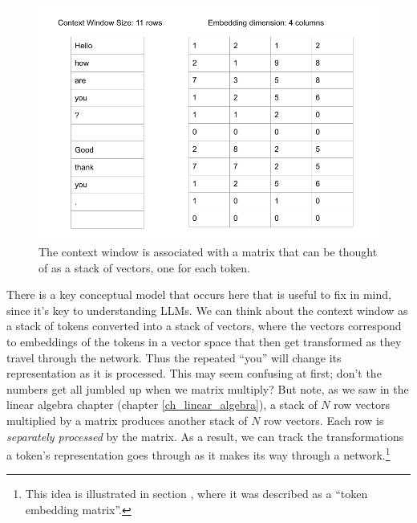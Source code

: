 \begin{figure}[h]
\centering
\includegraphics[scale=.45]{./images/contextWindowAsStack.png}
\caption[Jeff Yoshimi]{The context window is associated with a matrix that can be thought of as a stack of vectors, one for each token. }
\label{nextWordPrediction}
\end{figure}

There is a key conceptual model that occurs here that is useful to fix in mind, since it's key to understanding LLMs. We can think about the context window as a stack of tokens converted into a stack of vectors, where the vectors correspond to embeddings of the tokens in a vector space that then get transformed as they travel through the network. Thus the repeated ``you'' will change its representation as it is processed. This may seem confusing at first; don't the numbers get all jumbled up when we matrix multiply? But note, as we saw in the linear algebra chapter (chapter \ref{ch_linear_algebra}), a stack of $N$ row vectors multiplied by a matrix produces another stack of $N$ row vectors. Each row is \emph{separately processed} by the matrix. As a result, we can track the transformations a token's representation goes through as it makes its way through a network.\footnote{This idea is illustrated in section , where it was described as a ``token embedding matrix''.}


